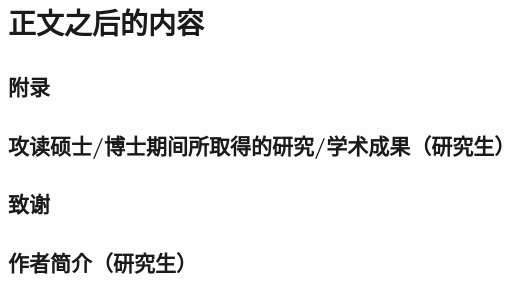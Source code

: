     \section{正文之后的内容}
        \subsection{附录}
        \subsection{攻读硕士\slash 博士期间所取得的研究\slash 学术成果（研究生）}
        \subsection{致谢}
        \subsection{作者简介（研究生）}